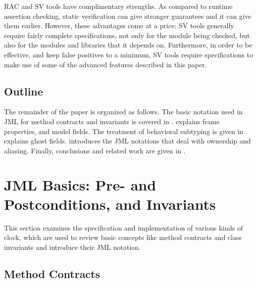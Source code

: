 \documentclass{llncs}
\begin{document}
RAC and SV tools have complimentary strengths.
As compared to runtime assertion checking, static verification can give
stronger guarantees and it can give them earlier.
However, these advantages come at a price:
%
SV tools generally require fairly complete specifications, not only for the
module being checked, but also for the modules and libraries that it depends
on. Furthermore, in order to be effective, and keep false positives to a
minimum, SV tools require specifications to make use of some of the advanced
features described in this paper.

\subsection{Outline}

The remainder of the paper is organized as follows.
The basic notation used in JML for method contracts
and invariants is covered in .
 explains frame properties, and  model fields.
The treatment of behavioral subtyping is given in .
 explains ghost fields.
 introduces the JML notations that deal with
ownership and aliasing.  
Finally, conclusions and related work are given in .

\section{JML Basics: Pre- and Postconditions, and Invariants}
\label{Sec:basics}

%
%
This section examines the specification and implementation of
various kinds of clock, which are used to review basic concepts like
method contracts and class invariants and introduce their JML notation.

\subsection{Method Contracts}
\end{document}
